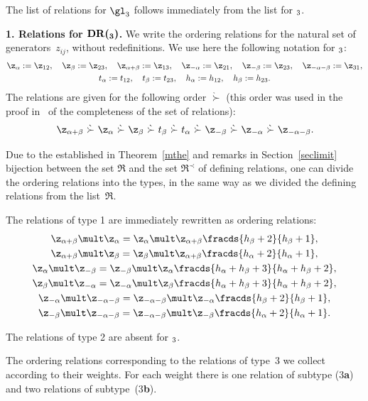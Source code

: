 \documentclass[pdftex]{sigma}
\def\a{\alpha}\def\Ar{{\rm A}}\def\Ab{\bar{\rm A}}\def\b{\beta}\def\bb{\mathfrak{b}}
\numberwithin{equation}{section}
\begin{document}
The list of relations for $\gl_3$ follows immediately from the list for $\sl_3$.

{\bf 1. Relations for $\boldsymbol{{\mathrm{DR}}(\sl_3)}$.} We write the ordering relations for the natural set of generators~$z_{ij}$, without redef\/initions.
We use here the following notation for $\sl_3$:
\begin{gather*}\z_\a :=\z_{12} ,\quad \z_\b :=\z_{23} ,\quad \z_{\a+\b} :=\z_{13} ,\quad \z_{-\a}:=\z_{21} ,
\quad \z_{-\b} :=\z_{23} ,\quad \z_{-\a-\b} :=\z_{31} ,
\\
t_\a:=t_{12} ,\quad t_\b:=t_{23} ,\quad h_\a:=h_{12} ,\quad h_\b:=h_{23} .
\end{gather*}
The relations are given for the following order $\grave{\succ}$ (this order was used in the proof in~\cite{KO3} of the completeness of
the set of relations):
\begin{gather}
 \z_{\a+\b}\ \grave{\succ}\ \z_{\a}\ \grave{\succ}\ \z_{\b}\ \grave{\succ}\ t_\b\ \grave{\succ}\ t_\a\ \grave{\succ}\ \z_{-\b}\ \grave{\succ}\ \z_{-\a}\
\grave{\succ}\ \z_{-\a-\b} .\label{stord}
\end{gather}

Due to the established in Theorem~\ref{mthe} and remarks in Section~\ref{seclimit} bijection between the set $\mathfrak{R}$ and the set $\mathfrak{R}^\prec$
of def\/ining relations, one can divide the ordering relations into the types, in the same way as we divided the def\/ining relations from the list~$\mathfrak{R}$.


The relations of type 1 are immediately rewritten as ordering relations:
\begin{gather}
\z_{\a +\b}\mult\z_\a =\z_\a\mult \z_{\a +\b}  \fracds{h_\b +2}{h_\b +1} ,\label{strel1}\\
\z_{\a +\b}\mult\z_\b =\z_\b\mult \z_{\a +\b} \fracds{h_\a +2}{h_\a +1} ,\\
\z_\a\mult \z_{-\b} =\z_{-\b}\mult\z_\a  \fracds{h_\a +h_\b +3}{h_\a +h_\b +2} ,\\
\z_\b\mult \z_{-\a} =\z_{-\a}\mult\z_\b  \fracds{h_\a +h_\b +3}{h_\a +h_\b +2} ,\\
\z_{-\a}\mult\z_{-\a -\b}=\z_{-\a -\b}\mult\z_{-\a} \fracds{h_\b +2}{h_\b +1} ,\\
\z_{-\b}\mult\z_{-\a -\b}=\z_{-\a -\b}\mult\z_{-\b} \fracds{h_\a +2}{h_\a +1} .
\end{gather}

The relations of type 2 are absent for $\sl_3$.


The ordering relations corresponding to the relations of type~3  we collect according to their weights. For each weight there
is one relation of subtype (3{\bf a}) and two relations of subtype~(3{\bf b}).
\end{document}
